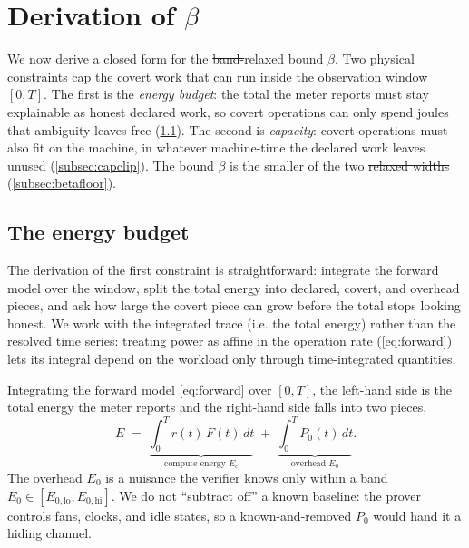 \documentclass{article}
\makeatletter
\theoremstyle{plain}
\theoremstyle{definition}
\theoremstyle{remark}
\providecommand{\DIFaddtex}[1]{{\protect\color{blue}\uwave{#1}}} %
\providecommand{\DIFdeltex}[1]{{\protect\color{red}\sout{#1}}} %
\providecommand{\DIFaddbegin}{} %
\providecommand{\DIFaddend}{} %
\providecommand{\DIFdelbegin}{} %
\providecommand{\DIFdelend}{} %
\providecommand{\DIFadd}[1]{\texorpdfstring{\DIFaddtex{#1}}{#1}} %
\providecommand{\DIFdel}[1]{\texorpdfstring{\DIFdeltex{#1}}{}} %
\providecommand{\DIFscaledelfig}{0.5}
\newlength{\DIFdelgraphicswidth} %
\newlength{\DIFdelgraphicsheight} %
\providecommand{\DIFaddincludegraphics}[2][]{{\color{blue}\fbox{\DIFOincludegraphics[#1]{#2}}}} %
\providecommand{\DIFdelincludegraphics}[2][]{%
\sbox{\DIFdelgraphicsbox}{\DIFOincludegraphics[#1]{#2}}%
\settoboxwidth{\DIFdelgraphicswidth}{\DIFdelgraphicsbox} %
\settoboxtotalheight{\DIFdelgraphicsheight}{\DIFdelgraphicsbox} %
\scalebox{\DIFscaledelfig}{%
\parbox[b]{\DIFdelgraphicswidth}{\usebox{\DIFdelgraphicsbox}\\[-\baselineskip] \rule{\DIFdelgraphicswidth}{0em}}\llap{\resizebox{\DIFdelgraphicswidth}{\DIFdelgraphicsheight}{%
\setlength{\unitlength}{\DIFdelgraphicswidth}%
\begin{picture}(1,1)%
\thicklines\linethickness{2pt} %
{\color[rgb]{1,0,0}\put(0,0){\framebox(1,1){}}}%
{\color[rgb]{1,0,0}\put(0,0){\line( 1,1){1}}}%
{\color[rgb]{1,0,0}\put(0,1){\line(1,-1){1}}}%
\end{picture}%
}\hspace*{3pt}}} %
} %
\DeclareRobustCommand{\DIFaddbegin}{\DIFOaddbegin \let\includegraphics\DIFaddincludegraphics} %
\DeclareRobustCommand{\DIFaddend}{\DIFOaddend \let\includegraphics\DIFOincludegraphics} %
\DeclareRobustCommand{\DIFdelbegin}{\DIFOdelbegin \let\includegraphics\DIFdelincludegraphics} %
\DeclareRobustCommand{\DIFdelend}{\DIFOaddend \let\includegraphics\DIFOincludegraphics} %
\let\sout@orig\sout %
\renewcommand{\sout}[1]{\ifmmode\text{\sout@orig{\ensuremath{#1}}}\else\sout@orig{#1}\fi} %
\makeatother
\begin{document}
\section{Derivation of \texorpdfstring{$\beta$}{beta}}
\label{sec:floor}

We now derive a closed form for the \DIFdelbegin \DIFdel{band-}\DIFdelend relaxed bound $\beta$. Two physical constraints cap the
covert work that can run inside the observation window $[0,T]$. The first is the
\emph{energy budget}: the total the meter reports must stay explainable as
honest declared work, so covert operations can only spend joules that
ambiguity leaves free (\cref{subsec:derivation}). The second is
\emph{capacity}: covert operations must also fit on the machine, in whatever
machine-time the declared work leaves unused (\cref{subsec:capclip}). The
bound $\beta$ is the smaller of the two \DIFdelbegin \DIFdel{relaxed widths }\DIFdelend \DIFaddbegin \DIFadd{caps }\DIFaddend (\cref{subsec:betafloor}).

\subsection{The energy budget}
\label{subsec:derivation}

The derivation of the first constraint is straightforward: integrate the forward
model over the window, split the total energy into declared, covert, and
overhead pieces, and ask how large the covert piece can grow before the total
stops looking honest. We work with the integrated trace (i.e. the total
energy) rather than the resolved time series: treating power as affine in the
operation rate (\cref{eq:forward}) lets its integral depend on the workload
only through time-integrated quantities.

Integrating the forward model \cref{eq:forward} over $[0,T]$, the left-hand
side is the total energy the meter reports and the right-hand side falls
into two pieces,
\begin{equation}
	E \;=\; \underbrace{\int_0^T r(t)\,F(t)\,dt}_{\text{compute energy } E_c}
	\;+\; \underbrace{\int_0^T P_0(t)\,dt}_{\text{overhead } E_0}.
	\label{eq:integrated}
\end{equation}
The overhead $E_0$ is a nuisance the verifier knows only within a band
$E_0 \in [E_{0,\mathrm{lo}}, E_{0,\mathrm{hi}}]$. We do not ``subtract
off'' a known baseline: the prover controls fans, clocks, and idle states,
so a known-and-removed $P_0$ would hand it a hiding channel.
\end{document}
